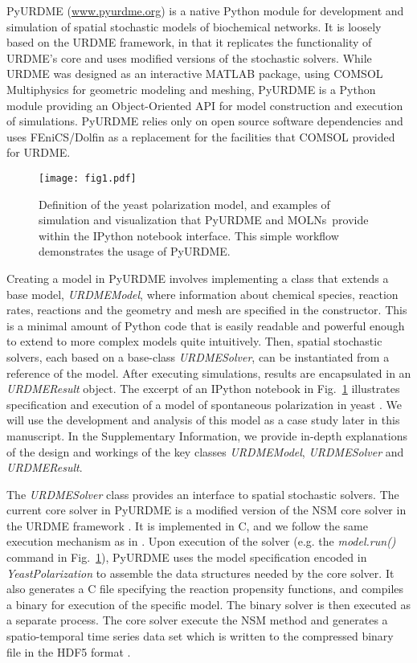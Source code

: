 \documentclass[final,leqno,onefignum,onetabnum]{siamltex1213}
\def\packagename {MOLNs}
\begin{document}
PyURDME (\url{www.pyurdme.org}) is a native Python module for development and simulation of spatial stochastic models of biochemical networks. It is loosely based on the URDME \cite{urdme} framework, in that it replicates the functionality of URDME's core and uses modified versions of the stochastic solvers. While URDME was designed as an interactive MATLAB package, using COMSOL Multiphysics for geometric modeling and meshing, PyURDME is a Python module providing an Object-Oriented API for model construction and execution of simulations. PyURDME relies only on open source software dependencies and uses FEniCS/Dolfin \cite{LoggMardalEtAl2012a} as a replacement for the facilities that COMSOL provided for URDME. 

\begin{figure}[htpb]
\begin{center}
\texttt{[image: fig1.pdf]}
\end{center}
\caption{Definition of the yeast polarization model, and examples of simulation and visualization that PyURDME and \packagename~provide within the IPython notebook interface.  This simple workflow demonstrates the usage of PyURDME.
}
\label{fig:fig1}
\end{figure}

Creating a model in PyURDME involves implementing a class that extends a base model, \emph{URDMEModel}, where information about chemical species, reaction rates, reactions and the geometry and mesh are specified in the constructor. This is a minimal amount of Python code that is easily readable and powerful enough to extend to more complex models quite intuitively. Then, spatial stochastic solvers, each based on a base-class \emph{URDMESolver}, can be instantiated from  a reference of the model. After executing simulations, results are encapsulated in an \emph{URDMEResult} object. The excerpt of an IPython notebook \cite{ipython} in Fig.~\ref{fig:fig1} illustrates specification and execution of a model of spontaneous polarization in yeast \cite{Altschuler2008}. We will use the development and analysis of this model as a case study later in this manuscript.
In the Supplementary Information, we provide in-depth explanations of the design and workings of the key classes \emph{URDMEModel}, \emph{URDMESolver} and \emph{URDMEResult}.

The \emph{URDMESolver} class provides an interface to spatial stochastic solvers.  The current core solver in PyURDME is a modified version of the NSM \cite{NSM} core solver in the URDME framework \cite{urdme}. It is implemented in C, and we follow the same execution mechanism as in \cite{urdme}.  Upon execution of the solver (e.g. the \emph{model.run()} command in Fig.~\ref{fig:fig1}), PyURDME uses the model specification encoded in \emph{YeastPolarization} to assemble the data structures needed by the core solver. It also generates a C file specifying the reaction propensity functions, and compiles a binary for execution of the specific model. The binary solver is then executed as a separate process.
The core solver execute the NSM method and generates a spatio-temporal time series data set which is written to the compressed binary file in the HDF5 format \cite{hdf5}. 
\end{document}
